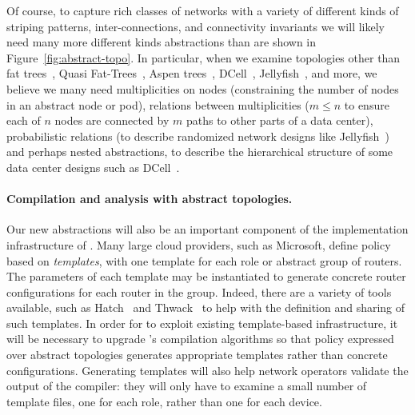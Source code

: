 Of course, to capture rich classes of networks with a variety of
different kinds of striping patterns, inter-connections, and connectivity
invariants
we will likely need many more different kinds abstractions than are
shown in Figure~\ref{fig:abstract-topo}.  In particular, when we examine 
topologies other than fat trees~\cite{al-fares:data-center-architecture,f10},
Quasi Fat-Trees~\cite{quasi-fat-trees}, Aspen trees~\cite{aspen-trees}, DCell~\cite{dcell}, Jellyfish~\cite{jellyfish}, and more,
we believe we many need multiplicities on nodes (constraining the
number of nodes in an abstract node or pod), relations between 
multiplicities ($m \leq n$
to ensure each of $n$ nodes are connected by $m$ paths to other parts of
a data center), probabilistic relations (to describe randomized network
designs like Jellyfish~\cite{jellyfish}) and perhaps nested abstractions, to describe the
hierarchical structure of some data center designs such as DCell~\cite{dcell}.  

\paragraph*{Compilation and analysis with abstract topologies.}
Our new abstractions will also be an important component of the implementation
infrastructure of \Propane. 
Many large cloud providers, such as Microsoft, define policy based on
\emph{templates}, with one template for each role or abstract group of
routers.  The parameters of each template may be instantiated to generate
concrete router configurations for each router in the group.
Indeed, there are a variety of tools available, such as Hatch~\cite{hatch}
and Thwack~\cite{thwack} 
to help with the definition and sharing of such templates.
In order for \Propane to exploit existing template-based infrastructure,
it will be necessary to upgrade \Propane's compilation algorithms so
that policy expressed over abstract topologies generates appropriate
templates rather than concrete configurations.  Generating templates will
also help network operators validate the output of the \Propane compiler:
they will only have to examine a small number of template files, one for
each role, rather than one for each device.

